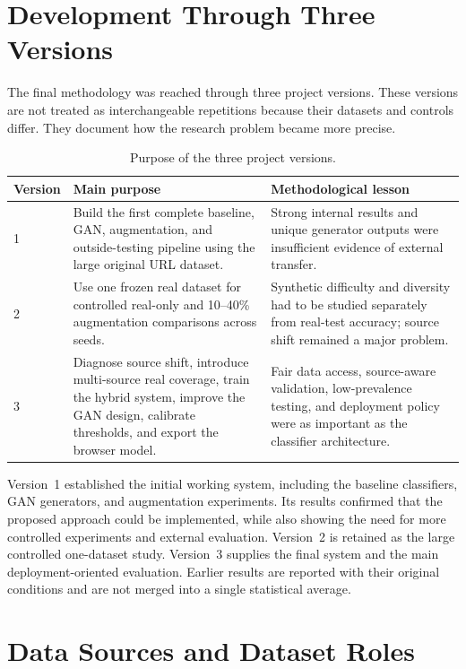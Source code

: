 \section{Development Through Three Versions}

The final methodology was reached through three project versions. These
versions are not treated as interchangeable repetitions because their datasets
and controls differ. They document how the research problem became more
precise.

\begin{table}[htbp]
\centering
\caption{Purpose of the three project versions.}
\label{tab:method-versions}
\small
\begin{tabular}{@{}p{}p{}p{}@{}}
\toprule
Version & Main purpose & Methodological lesson \\
\midrule
1 & Build the first complete baseline, GAN, augmentation, and outside-testing pipeline using the large original URL dataset. & Strong internal results and unique generator outputs were insufficient evidence of external transfer. \\
2 & Use one frozen real dataset for controlled real-only and 10--40\% augmentation comparisons across seeds. & Synthetic difficulty and diversity had to be studied separately from real-test accuracy; source shift remained a major problem. \\
3 & Diagnose source shift, introduce multi-source real coverage, train the hybrid system, improve the GAN design, calibrate thresholds, and export the browser model. & Fair data access, source-aware validation, low-prevalence testing, and deployment policy were as important as the classifier architecture. \\
\bottomrule
\end{tabular}
\end{table}

Version~1 established the initial working system, including the baseline
classifiers, GAN generators, and augmentation experiments. Its results
confirmed that the proposed approach could be implemented, while also showing
the need for more controlled experiments and external evaluation. Version~2 is
retained as the large controlled one-dataset study. Version~3 supplies the final
system and the main deployment-oriented evaluation. Earlier results are
reported with their original conditions and are not merged into a single
statistical average.

\section{Data Sources and Dataset Roles}

